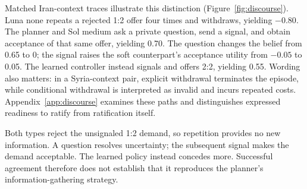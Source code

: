 Matched Iran-context traces illustrate this distinction (Figure~\ref{fig:discourse}). Luna none repeats a rejected 1:2 offer four times and withdraws, yielding $-0.80$. The planner and Sol medium ask a private question, send a signal, and obtain acceptance of that same offer, yielding 0.70. The question changes the belief from 0.65 to 0; the signal raises the soft counterpart's acceptance utility from $-0.05$ to 0.05. The learned controller instead signals and offers 2:2, yielding 0.55. Wording also matters: in a Syria-context pair, explicit withdrawal terminates the episode, while conditional withdrawal is interpreted as invalid and incurs repeated costs. Appendix~\ref{app:discourse} examines these paths and distinguishes expressed readiness to ratify from ratification itself.

Both types reject the unsignaled 1:2 demand, so repetition provides no new information. A question resolves uncertainty; the subsequent signal makes the demand acceptable. The learned policy instead concedes more. Successful agreement therefore does not establish that it reproduces the planner's information-gathering strategy.
